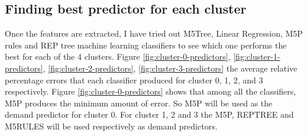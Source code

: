 \subsection {Finding best predictor for each cluster}
Once the features are extracted, I have tried out  M5Tree, Linear Regression, M5P rules and REP tree machine learning classifiers to see which one performs the best for each of the 4 clusters. Figure \ref{fig:cluster-0-predictors}, \ref{fig:cluster-1-predictors}, \ref{fig:cluster-2-predictors}, \ref{fig:cluster-3-predictors} the average relative percentage errors that each classifier produced for cluster 0, 1, 2, and 3 respectively. Figure \ref{fig:cluster-0-predictors} shows that among all the classifiers, M5P produces the minimum amount of error. So M5P will be used as the demand predictor for cluster 0. For cluster 1, 2 and 3 the M5P, REPTREE and M5RULES will be used respectively as demand predictors.

